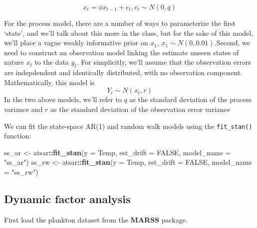 \documentclass[
]{article}
\newenvironment{Shaded}{\begin{snugshade}}{\end{snugshade}}
\newcommand{\DataTypeTok}[1]{\textcolor[rgb]{0.13,0.29,0.53}{#1}}
\newcommand{\KeywordTok}[1]{\textcolor[rgb]{0.13,0.29,0.53}{\textbf{#1}}}
\newcommand{\NormalTok}[1]{#1}
\newcommand{\OperatorTok}[1]{\textcolor[rgb]{0.81,0.36,0.00}{\textbf{#1}}}
\newcommand{\OtherTok}[1]{\textcolor[rgb]{0.56,0.35,0.01}{#1}}
\newcommand{\StringTok}[1]{\textcolor[rgb]{0.31,0.60,0.02}{#1}}
\begin{document}
\[x_{t} = \phi  x_{t-1} + e_{t}, e_{t} \sim N(0,q)\]

For the process model, there are a number of ways to parameterize the
first `state', and we'll talk about this more in the class, but for the
sake of this model, we'll place a vague weakly informative prior on
\(x_1\), \(x_1 \sim N(0, 0.01)\).Second, we need to construct an
observation model linking the estimate unseen states of nature \(x_t\)
to the data \(y_t\). For simplicitly, we'll assume that the observation
errors are indepdendent and identically distributed, with no observation
component. Mathematically, this model is \[Y_t \sim N(x_t, r)\] In the
two above models, we'll refer to \(q\) as the standard deviation of the
process variance and \(r\) as the standard deviation of the observation
error variance

We can fit the state-space AR(1) and random walk models using the
\texttt{fit\_stan()} function:

\begin{Shaded}
\begin{Highlighting}[]
\NormalTok{ss_ar <-}\StringTok{ }\NormalTok{atsar}\OperatorTok{::}\KeywordTok{fit_stan}\NormalTok{(}\DataTypeTok{y =}\NormalTok{ Temp, }\DataTypeTok{est_drift =} \OtherTok{FALSE}\NormalTok{, }\DataTypeTok{model_name =} \StringTok{"ss_ar"}\NormalTok{)}
\NormalTok{ss_rw <-}\StringTok{ }\NormalTok{atsar}\OperatorTok{::}\KeywordTok{fit_stan}\NormalTok{(}\DataTypeTok{y =}\NormalTok{ Temp, }\DataTypeTok{est_drift =} \OtherTok{FALSE}\NormalTok{, }\DataTypeTok{model_name =} \StringTok{"ss_rw"}\NormalTok{)}
\end{Highlighting}
\end{Shaded}

\hypertarget{sec-stan-dfa}{%
\subsection{Dynamic factor analysis}\label{sec-stan-dfa}}

First load the plankton dataset from the \textbf{MARSS} package.
\end{document}
